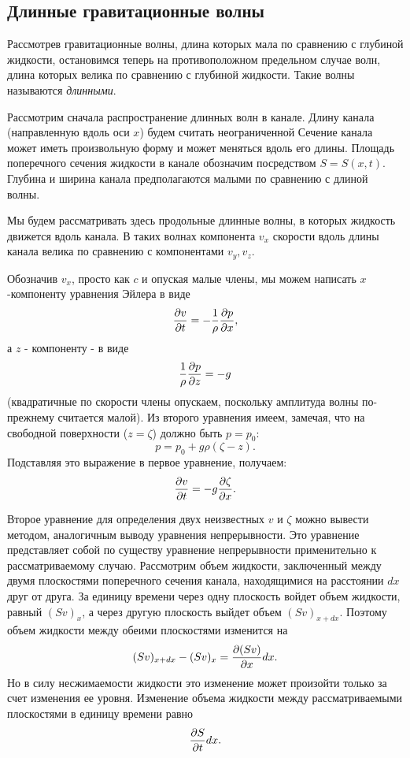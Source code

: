 \subsection*{Длинные гравитационные волны}

Рассмотрев гравитационные волны, длина которых мала по сравнению с глубиной
жидкости, остановимся теперь на противоположном предельном случае волн, длина
которых велика по сравнению с глубиной жидкости. Такие волны называются
\textit{длинными}.

Рассмотрим сначала распространение длинных волн в канале. Длину канала
(направленную вдоль оси $x$) будем считать неограниченной Сечение канала может
иметь произвольную форму и может меняться вдоль его длины. Площадь поперечного
сечения жидкости в канале обозначим посредством $S = S(x,t)$. Глубина и ширина
канала предполагаются малыми по сравнению с длиной волны.

Мы будем рассматривать здесь продольные длинные волны, в которых жидкость
движется вдоль канала. В таких волнах компонента $v_x$ скорости вдоль длины
канала велика по сравнению с компонентами $v_y, v_z$.

Обозначив $v_x$, просто как $c$ и опуская малые члены, мы можем написать
$x$-компоненту уравнения Эйлера в виде
\[
   \frac{\partial{v}}{\partial{t}} = - \frac1{\rho} \frac{\partial{p}}{\partial{x}},
\]
а $z$ - компоненту - в виде
\[
   \frac1{\rho} \frac{\partial{p}}{\partial{z}} = -g
\]
(квадратичные по скорости члены опускаем, поскольку амплитуда волны по-прежнему
считается малой). Из второго уравнения имеем, замечая, что на свободной
поверхности ($z = \zeta$) должно быть $p = p_0$:
\[
   p = p_0 + g\rho(\zeta - z).
\]
Подставляя это выражение в первое уравнение, получаем:
\begin{equation}
 \label{eq:12.11}
   \frac{\partial{v}}{\partial{t}} = - g \frac{\partial{\zeta}}{\partial{x}}.
\end{equation}

Второе уравнение для определения двух неизвестных $v$ и $\zeta$ можно вывести
методом, аналогичным выводу уравнения непрерывности. Это уравнение представляет
собой по существу уравнение непрерывности применительно к рассматриваемому
случаю. Рассмотрим объем жидкости, заключенный между двумя плоскостями
поперечного сечения канала, находящимися на расстоянии $dx$ друг от друга. За
единицу времени через одну плоскость войдет объем жидкости, равный $(Sv)_x$, а
через другую плоскость выйдет объем $(Sv)_{x+dx}$. Поэтому объем жидкости между
обеими плоскостями изменится на
\[
   (Sv)_{x+dx} - (Sv)_x = \frac{\partial{(Sv)}}{\partial{x}}dx.
\]
Но в силу несжимаемости жидкости это изменение может произойти только за счет
изменения ее уровня. Изменение объема жидкости между рассматриваемыми
плоскостями в единицу времени равно
\[
   \frac{\partial{S}}{\partial{t}}dx.
\]

